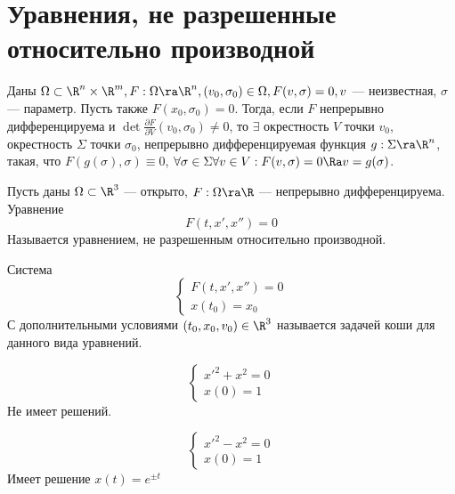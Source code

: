 
\section{Уравнения, не разрешенные относительно производной}

\begin{theorem}
    Даны \(\Omega \subset \R^n \times \R^m, F: \Omega \ra \R^n, (v_0, \sigma_0) \in \Omega, F(v, \sigma) = 0, v\) --- неизвестная, \(\sigma\) --- параметр. Пусть также \(F(x_0, \sigma_0) = 0\). Тогда, если \(F\) непрерывно дифференцируема и \(\det\frac{\partial F}{\partial V}(v_0, \sigma_0) \ne 0\), то \(\exists \) окрестность \(V\) точки \(v_0\), окрестность \(\Sigma\) точки \(\sigma_0\), непрерывно дифференцируемая функция \(g: \Sigma \ra \R^n\), такая, что \(F(g(\sigma), \sigma) 
    \equiv 0\), \(\forall \sigma \in \Sigma \forall v \in V: F(v, \sigma) = 0 \Ra v = g(\sigma)\).
\end{theorem}

\begin{definition}
    Пусть даны \(\Omega \subset \R^3\) --- открыто, \(F: \Omega \ra \R\) --- непрерывно дифференцируема. Уравнение
    \[F(t, x', x'') = 0\]
    Называется уравнением, не разрешенным относительно производной.
\end{definition}

\begin{definition}
    Система
    \begin{equation}
        \begin{cases}
            F(t, x', x'') = 0 \\
            x(t_0) = x_0
        \end{cases}
    \end{equation}
    С дополнительными условиями \((t_0, x_0, v_0) \in \R^3\) называется задачей коши для данного вида уравнений.
\end{definition}

\begin{example}
    \[\left\{\begin{array}{l}
        x'^2 + x^2 = 0 \\
        x(0) = 1
    \end{array}\right.\]
    Не имеет решений.
\end{example}

\begin{example}
    \[\left\{\begin{array}{l}
        x'^2 - x^2 = 0 \\
        x(0) = 1
    \end{array}\right.\]
    Имеет решение \(x(t) = e^{\pm t}\)
\end{example}

